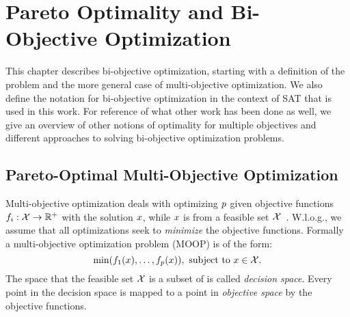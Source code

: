\chapter{Pareto Optimality and Bi-Objective Optimization\label{chap:biobjective-optimization}}

This chapter describes bi-objective optimization, starting with a definition of the problem and the more general case of multi-objective optimization.
We also define the notation for bi-objective optimization in the context of SAT that is used in this work.
For reference of what other work has been done as well, we give an overview of other notions of optimality for multiple objectives and different approaches to solving bi-objective optimization problems.

\section{Pareto-Optimal Multi-Objective Optimization\label{sec:multiopt}}

Multi-objective optimization deals with optimizing $p$ given objective functions $f_i: \mathcal{X} \rightarrow \mathbb{R}^+$ with the solution $x$, while $x$ is from a feasible set $\mathcal{X}$~\autocite{Ehrgott2005-1}.
W.l.o.g., we assume that all optimizations seek to \emph{minimize} the objective functions.
Formally a multi-objective optimization problem (MOOP) is of the form:
\begin{equation}\label{eq:moop}
  \min (f_1(x),\dots,f_p(x)),\ \text{subject to}\ x\in \mathcal{X}.
\end{equation}
The space that the feasible set $\mathcal{X}$ is a subset of is called \emph{decision space}.
Every point in the decision space is mapped to a point in \emph{objective space} by the objective functions.

